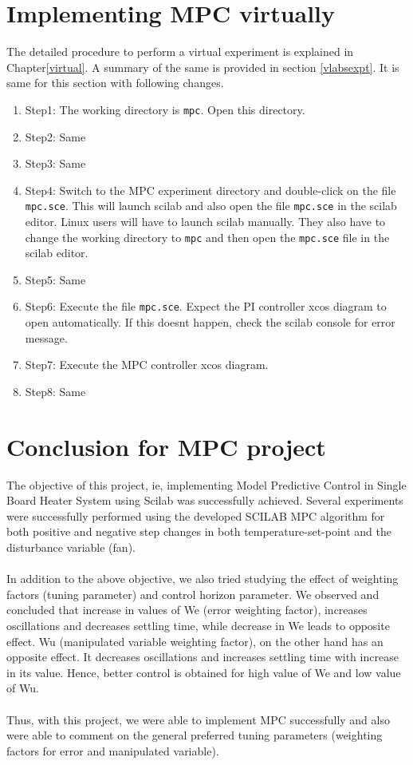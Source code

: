 \section{Implementing MPC virtually}

The detailed procedure to perform a virtual experiment is explained in Chapter\ref{virtual}. A summary of the same is provided in section \ref{vlabsexpt}. It is same for this section with following changes.

\begin{enumerate}
\item Step1: The working directory is {\tt  mpc}. Open this directory.
\item Step2: Same
\item Step3: Same
\item Step4:  Switch to the MPC experiment directory and double-click on the file {\tt mpc.sce}. This will launch scilab and also open the file {\tt mpc.sce} in the scilab editor. Linux users will have to launch scilab manually. They also have to change the working directory to {\tt mpc} and then open the {\tt  mpc.sce} file in the scilab editor.
\item Step5: Same
\item Step6: Execute the file {\tt mpc.sce}.  Expect the PI controller xcos diagram to open automatically. If this doesnt happen, check the scilab console for error message.
\item Step7: Execute the MPC controller xcos diagram.
\item Step8: Same
\end{enumerate}

\section{Conclusion for MPC project}
The objective of this project, ie, implementing Model Predictive Control in Single Board Heater System using Scilab was successfully achieved. Several experiments were successfully performed using the developed SCILAB MPC algorithm for both positive and negative step changes in both temperature-set-point and the disturbance variable (fan). 
\\ \\ 
In addition to the above objective, we also tried studying the effect of weighting factors (tuning parameter) and control horizon parameter. We observed and concluded that increase in values of We (error weighting factor), increases oscillations and decreases settling time, while decrease in We leads to opposite effect. Wu (manipulated variable weighting factor), on the other hand has an opposite effect. It decreases oscillations and increases settling time with increase in its value. Hence, better control is obtained for high value of We and low value of Wu.
\\ \\
Thus, with this project, we were able to implement MPC successfully and also were able to comment on the general preferred tuning parameters (weighting factors for error and manipulated variable).

